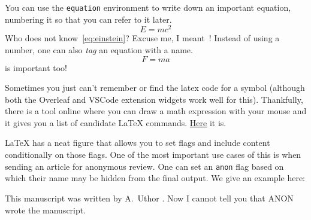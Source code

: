 \begin{Rule} 
    You can use the \lstinline|equation| environment to write down an important equation, numbering it so that you can refer 
    to it later.
    \begin{equation}\label{eq:einstein}
        E = mc^2 
    \end{equation}
    Who does not know~\cref{eq:einstein}? Excuse me, I meant~! Instead of using a number,
    one can also \emph{tag} an equation with a name.
    \begin{equation}\label{eq:force}
        F = ma \tag{force}
    \end{equation}
     is important too!
\end{Rule}

\begin{Rule} [Detexify]
Sometimes you just can't remember or find the latex code for a symbol (although both the Overleaf
and VSCode extension widgets work well for this). Thankfully, there is a tool online where you can draw
a math expression with your mouse and it gives you a list of candidate \LaTeX{} commands. \href{https://detexify.kirelabs.org/classify.html}{Here} it is.    
\end{Rule}

\begin{Rule} 
    \LaTeX{} has a neat figure that allows you to set flags and include content conditionally on those flags.
    One of the most important use cases of this is when sending an article for anonymous review. 
    One can set an \lstinline|anon| flag based on which their name may be hidden from the final output.
    We give an example here:

    \newif\ifanon
    \anonfalse

    \newcommand{\authorname}{
        \ifanon ANON\else A.\ Uthor\fi
    }

    This manuscript was written by\authorname{}.
    \anontrue
    Now I cannot tell you that\authorname{} wrote the manuscript.

\end{Rule}